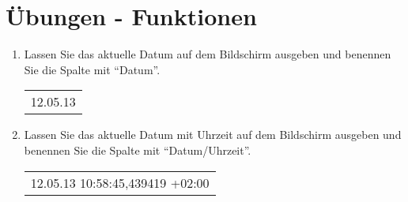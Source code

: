 \clearpage
    \section{Übungen - Funktionen}
      \begin{enumerate}
        \item Lassen Sie das aktuelle Datum auf dem Bildschirm ausgeben und
        benennen Sie die Spalte mit \enquote{Datum}.
        \begin{center}
          \begin{small}
            \tablehead{}
            \begin{msoraclesql}
              \begin{supertabular}{l}
                12.05.13 \\
              \end{supertabular}
            \end{msoraclesql}
          \end{small}
        \end{center}
        \item Lassen Sie das aktuelle Datum mit Uhrzeit auf dem Bildschirm
        ausgeben und benennen Sie die Spalte mit \enquote{Datum/Uhrzeit}.
        \begin{center}
          \begin{small}
            \tablehead{}
            \begin{msoraclesql}
              \begin{supertabular}{l}
                12.05.13 10:58:45,439419 +02:00 \\

\end{supertabular}
\end{msoraclesql}
\end{small}
\end{center}
\end{enumerate}

